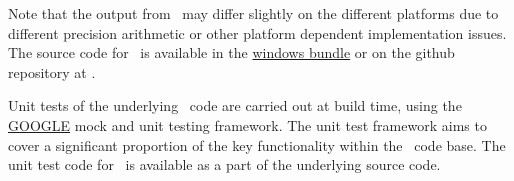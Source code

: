 Note that the output from \CNAME\ may differ slightly on the different platforms due to different precision arithmetic or other platform dependent implementation issues. The source code for \CNAME\ is available in the \href{ftp://ftp.niwa.co.nz/incoming/CASAL2_auto_build/casal2.tar.gz}{windows bundle} or on the github repository at \github.

Unit tests of the underlying \CNAME\ code are carried out at build time, using the \href{http://www.boost.org/}{GOOGLE} mock and unit testing framework. The unit test framework aims to cover a significant proportion of the key functionality within the \CNAME\ code base. The unit test code for \CNAME\ is available as a part of the underlying source code.


